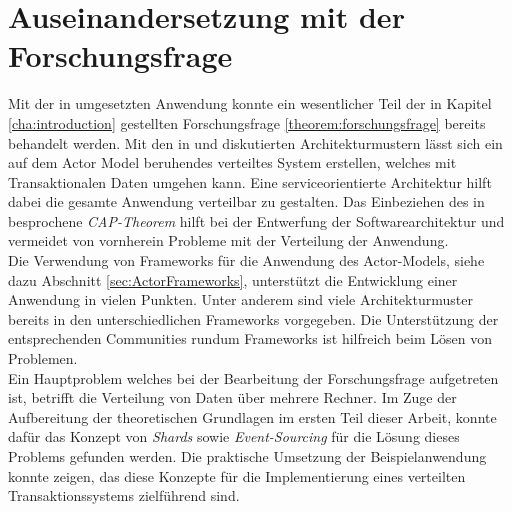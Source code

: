\section{Auseinandersetzung mit der Forschungsfrage}
Mit der in  umgesetzten Anwendung konnte ein wesentlicher Teil der in Kapitel \ref{cha:introduction} gestellten Forschungsfrage \ref{theorem:forschungsfrage} bereits behandelt werden. Mit den in \cite{Vernon2015ReactiveAkka} und \cite{akkaInAction} diskutierten Architekturmustern lässt sich ein auf dem Actor Model beruhendes verteiltes System erstellen, welches mit Transaktionalen Daten umgehen kann. Eine serviceorientierte Architektur hilft dabei die gesamte Anwendung verteilbar zu gestalten. 
Das  Einbeziehen des in \cite{gilbertPerspectiveCAPTheorem2012} besprochene \textit{CAP-Theorem} hilft bei der Entwerfung der Softwarearchitektur und vermeidet von vornherein Probleme mit der Verteilung der Anwendung. \\ 
Die Verwendung von Frameworks für die Anwendung des Actor-Models, siehe dazu Abschnitt \ref{sec:ActorFrameworks}, unterstützt die Entwicklung einer Anwendung in vielen Punkten. Unter anderem sind viele Architekturmuster bereits in den unterschiedlichen Frameworks vorgegeben. Die Unterstützung der entsprechenden Communities rundum Frameworks ist hilfreich beim Lösen von Problemen. \\
Ein Hauptproblem welches bei der Bearbeitung der Forschungsfrage aufgetreten ist, betrifft die Verteilung von Daten über mehrere Rechner. Im Zuge der Aufbereitung der theoretischen Grundlagen im ersten Teil dieser Arbeit, konnte dafür das Konzept von \textit{Shards} sowie \textit{Event-Sourcing} für die Lösung dieses Problems gefunden werden. Die praktische Umsetzung der Beispielanwendung konnte zeigen, das diese Konzepte für die Implementierung eines verteilten Transaktionssystems zielführend sind. 

